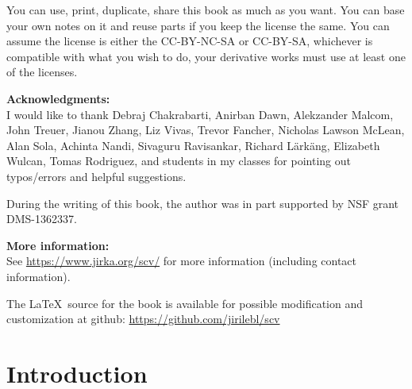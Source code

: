 \documentclass[12pt,openany]{book}
\theoremstyle{plain}
\theoremstyle{remark}
\theoremstyle{definition}
\theoremstyle{exercise}
\theoremstyle{example}
\begin{document}
\bigskip

\noindent
You can use, print, duplicate, share this book as much as you want.  You can
base your own notes on it and reuse parts if you keep the license the
same.  You can assume the license is either the CC-BY-NC-SA or CC-BY-SA\@,
whichever is compatible with what you wish to do, your derivative works must
use at least one of the licenses.

\bigskip

\noindent
\textbf{Acknowledgments:}
\\
I would like to thank Debraj Chakrabarti, Anirban Dawn, Alekzander Malcom,
John Treuer, Jianou Zhang, Liz Vivas, Trevor Fancher,
Nicholas Lawson McLean, Alan Sola, Achinta Nandi,
Sivaguru Ravisankar, Richard L\"ark\"ang, Elizabeth Wulcan,
Tomas Rodriguez,
and students in my classes for pointing out typos/errors
and helpful suggestions. 

\bigskip

\noindent
During the writing of this book, 
the author was in part supported by NSF grant DMS-1362337.

\bigskip

\noindent
\textbf{More information:}
\\
See \url{https://www.jirka.org/scv/} for more information
(including contact information).

\medskip

\noindent
The \LaTeX\ source for the book is available
for possible modification and customization
at github: \url{https://github.com/jirilebl/scv}



\tableofcontents
{}



\chapter*{Introduction} \label{ch:intro}
\end{document}
